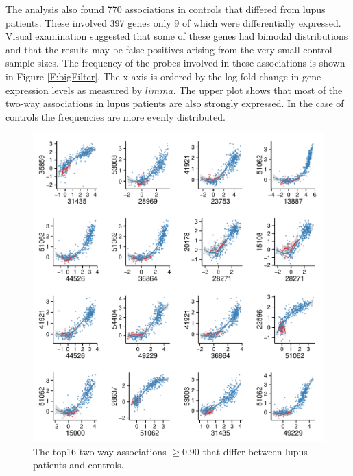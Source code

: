 \documentclass[a4paper, 12pt]{report}
\begin{document}
The analysis also found 770 associations in controls that differed from lupus patients. These involved 397 genes only 9 of which were differentially expressed. Visual examination suggested that some of these genes had bimodal distributions and that the results may be false positives arising from the very small control sample sizes. The frequency of the probes involved in these associations is shown in Figure \ref{F:bigFilter}. The x-axis is ordered by the log fold change in gene expression levels as measured by $limma$. The upper plot shows that most of the two-way associations in lupus patients are also strongly expressed. In the case of controls the frequencies are more evenly distributed.

\begin{figure}[H]
\begin{center}
\includegraphics[width=\textwidth]{bigScatter}
\caption{The top16 two-way associations $\ge 0.90$ that differ between lupus patients and controls.} 
\label{F:bigScatter}
\end{center}
\end{figure}
\end{document}
